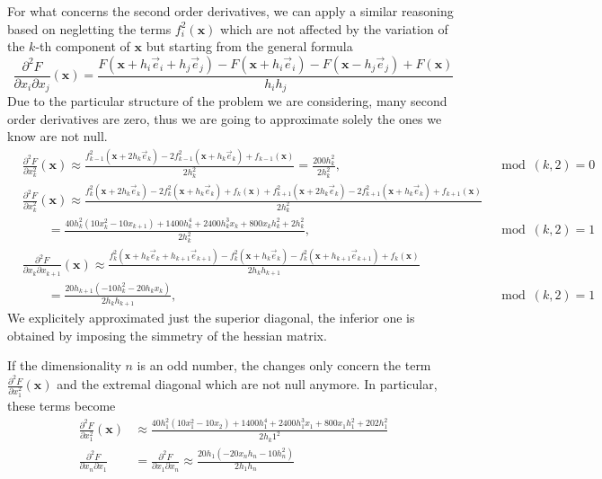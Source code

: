 For what concerns the second order derivatives, we can apply a similar reasoning based on negletting the terms $f_i^2(\mathbf{x})$ which are not affected by the variation of the $k$-th component of $\mathbf{x}$ but starting from the general formula
$$ \frac{\partial^2 F}{\partial x_i \partial x_j} (\mathbf{x})  = \frac{F(\mathbf{x} + h_i \vec{e}_i + h_j \vec{e}_j) - F(\mathbf{x} + h_i \vec{e}_i) - F(\mathbf{x} - h_j \vec{e}_j) + F(\mathbf{x})}{h_i h_j}$$
Due to the particular structure of the problem we are considering, many second order derivatives are zero, thus we are going to approximate solely the ones we know are not null.
\begin{align*}
    & \frac{\partial^2 F}{\partial x_k^2} (\mathbf{x}) \approx \frac{f_{k-1}^2 (\mathbf{x} + 2h_k \vec{e}_k) - 2 f_{k-1}^2 (\mathbf{x} + h_k \vec{e}_k) + f_{k-1}(\mathbf{x})}{2h_k^2} = \frac{200h_k^2}{2 h_k^2}, & \mod(k,2) = 0 \\
    & \frac{\partial^2 F}{\partial x_k^2} (\mathbf{x}) \approx \frac{f_{k}^2 (\mathbf{x} + 2h_k \vec{e}_k) - 2 f_{k}^2 (\mathbf{x} + h_k \vec{e}_k) + f_{k}(\mathbf{x}) + f_{k+1}^2 (\mathbf{x} + 2h_k \vec{e}_k) - 2 f_{k+1}^2 (\mathbf{x} + h_k \vec{e}_k) + f_{k+1}(\mathbf{x})}{2h_k^2} \\
    & \qquad = \frac{40h_k^2 (10x_k^2 - 10x_{k+1}) + 1400 h_k^4 + 2400h_k^3 x_k + 800 x_k h_k^2 + 2h_k^2}{2 h_k^2}, & \mod(k,2) = 1 \\
    & \frac{\partial^2 F}{\partial x_k \partial x_{k+1}} (\mathbf{x}) \approx \frac{f_{k}^2 (\mathbf{x} + h_k \vec{e}_k + h_{k+1} \vec{e}_{k+1}) - f_{k}^2 (\mathbf{x} + h_k \vec{e}_k) - f_{k}^2 (\mathbf{x} + h_{k+1} \vec{e}_{k+1}) + f_{k}(\mathbf{x})}{2h_k h_{k+1}} \\
    & \qquad = \frac{20h_{k+1} (-10h_k^2 - 20h_k x_k)}{2h_k h_{k+1}}, & \mod(k,2) = 1
\end{align*}
We explicitely approximated just the superior diagonal, the inferior one is obtained by imposing the simmetry of the hessian matrix.

If the dimensionality $n$ is an odd number, the changes only concern the term  $\frac{\partial^2 F}{\partial x_1^2} (\mathbf{x})$ and the extremal diagonal which are not null anymore. In particular, these terms become
\begin{align*}
    \frac{\partial^2 F}{\partial x_1^2} (\mathbf{x}) & \approx\frac{40h_1^2 (10x_1^2 - 10x_{2}) + 1400 h_1^4 + 2400h_1^3 x_1 + 800 x_1 h_1^2 + 202h_1^2 }{2 h_k1^2} \\
    \frac{\partial^2 F}{ \partial x_n \partial x_1} & = \frac{\partial^2 F}{ \partial x_1 \partial x_n} \approx \frac{20h_1(-20x_n h_n - 10h_n^2 )}{2h_1 h_n}
\end{align*}


